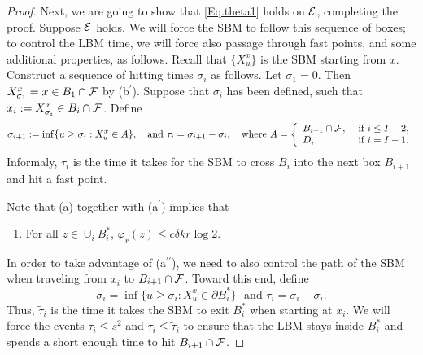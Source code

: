 \documentclass[11pt]{article}
\theoremstyle{definition}
\def \cB {{B}}
\def \d {\delta}
\def \ff {{\cal F}}
\def \s {\sigma}
\def \ee {{\cal E}}
\begin{document}
\begin{proof}
Next, we are going to show that \eqref{Eq.theta1} holds on $\ee$, completing the proof. Suppose $\ee$ holds. We will force the SBM to follow this sequence of boxes; to control
the LBM time, we will force also passage through
fast points, and some additional properties,
as follows.
Recall that $\{ X^x_u \}$ is the SBM starting from $x$. Construct a sequence of
hitting times $\s_i$ as follows.
Let $\s_1 = 0$. Then $X_{\s_1}^x = x \in B_1 \cap \ff$ by (b$^\prime$).
Suppose that $\s_i$ has been defined,
such that $x_i : = X^x_{\s_i} \in \cB_i \cap \ff $. Define
 $$
\s_{i+1} : = \inf\{ u \ge \s_i : X^x_u \in A \} , \ \ \ \mbox{and } \tau_i = \s_{i+1} - \s_i, \ \ \ \mbox{where } A = \left\{ \begin{array}{ll} \cB_{i+1}  \cap \ff , & \mbox{ if } i \le I-2 , \\
  D, & \mbox{ if } i = I - 1. \end{array} \right.
 $$
Informaly, $\tau_i$ is the time
it takes for the SBM to cross
$B_i$ into the next box $B_{i+1}$ and hit a fast point.

Note that (a) together with (a$^\prime$) implies that
  \begin{enumerate}
\item  For all
  $z \in \cup_i B_i^{*}$,
  $\varphi_r (z) \le c \d k r \log 2$.
 \end{enumerate}
In order to take advantage of (a$^{\prime\prime}$), we need to also control
the path of the SBM when traveling from
$x_i$ to $B_{i+1}\cap \ff$. Toward this end,
define
 $$
\tilde \s_i = \inf\{ u \ge \s_i : X^x_u \in \partial B_i^{*} \} \ \ \ \mbox{and } \tilde \tau_i = \tilde \s_i - \s_i .
 $$
Thus, $\tilde \tau_i$ is the time it
takes the SBM to exit $B^*_i$ when starting at $x_i$.
We will force the events
$\tau_i \le s^2$ and $\tau_i \le \tilde \tau_i$ to ensure that
the LBM stays inside $B_i^{*}$
and spends a short enough time to hit $B_{i+1} \cap \ff $.


\end{proof}
\end{document}
